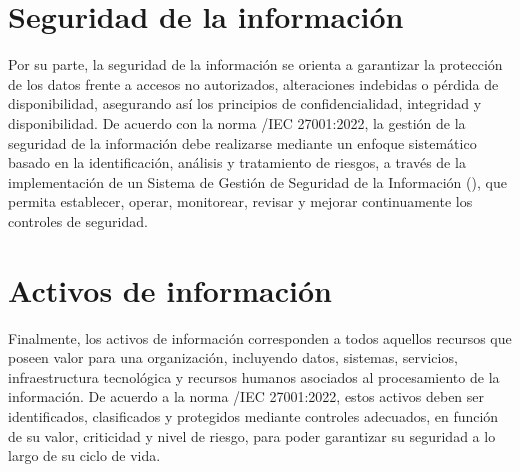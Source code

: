 \section{Seguridad de la información}
\noindent
Por su parte, la seguridad de la información se orienta a garantizar la protección de los datos frente a accesos no autorizados,
alteraciones indebidas o pérdida de disponibilidad, asegurando así los principios de confidencialidad, integridad y disponibilidad. 
De acuerdo con la norma \ISO/IEC 27001:2022, la gestión de la seguridad de la información debe realizarse mediante un enfoque 
sistemático basado en la identificación, análisis y tratamiento de riesgos, a través de la implementación de un Sistema de Gestión 
de Seguridad de la Información (\SGSI), que permita establecer, operar, monitorear, revisar y mejorar continuamente los controles 
de seguridad.~\cite{iso27001}

\section{Activos de información}
\noindent
Finalmente, los activos de información corresponden a todos aquellos recursos que poseen valor para una organización, incluyendo 
datos, sistemas, servicios, infraestructura tecnológica y recursos humanos asociados al procesamiento de la información. De acuerdo a 
la norma \ISO/IEC 27001:2022, estos activos deben ser identificados, clasificados y protegidos mediante controles adecuados, en función
de su valor, criticidad y nivel de riesgo, para poder garantizar su seguridad a lo largo de su ciclo de vida.


